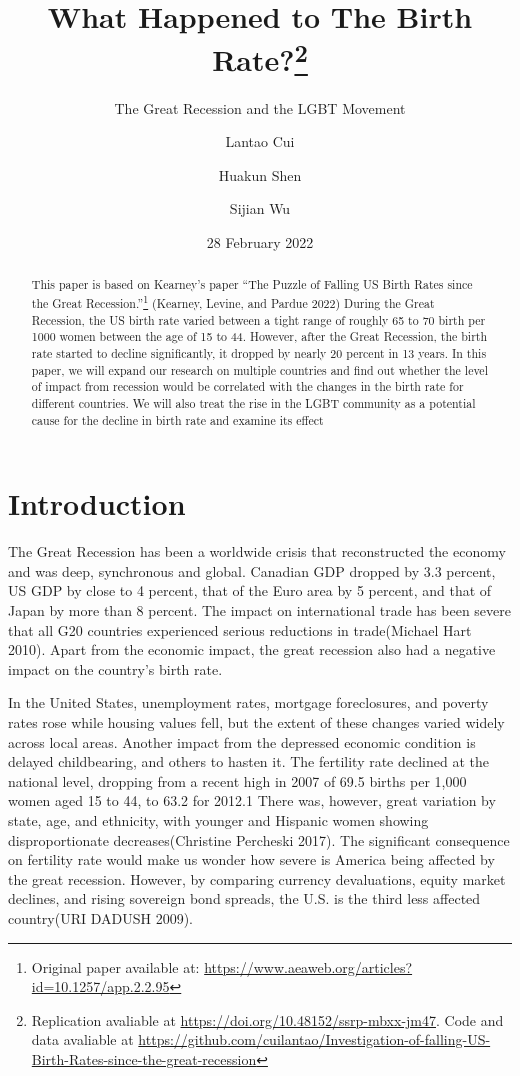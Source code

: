 \documentclass[
]{article}
\title{What Happened to The Birth Rate?\thanks{Replication avaliable at \url{https://doi.org/10.48152/ssrp-mbxx-jm47}. Code and data avaliable at \url{https://github.com/cuilantao/Investigation-of-falling-US-Birth-Rates-since-the-great-recession}}}
\subtitle{The Great Recession and the LGBT Movement}
\author{Lantao Cui \and Huakun Shen \and Sijian Wu}
\date{28 February 2022}
\begin{document}
\maketitle
\begin{abstract}
This paper is based on Kearney's paper ``The Puzzle of Falling US Birth Rates since the Great Recession.''\footnote{Original paper available at: \url{https://www.aeaweb.org/articles?id=10.1257/app.2.2.95}} (Kearney, Levine, and Pardue 2022) During the Great Recession, the US birth rate varied between a tight range of roughly 65 to 70 birth per 1000 women between the age of 15 to 44. However, after the Great Recession, the birth rate started to decline significantly, it dropped by nearly 20 percent in 13 years. In this paper, we will expand our research on multiple countries and find out whether the level of impact from recession would be correlated with the changes in the birth rate for different countries. We will also treat the rise in the LGBT community as a potential cause for the decline in birth rate and examine its effect
\end{abstract}

\hypertarget{introduction}{%
\section{Introduction}\label{introduction}}

The Great Recession has been a worldwide crisis that reconstructed the economy and was deep, synchronous and global. Canadian GDP dropped by 3.3 percent, US GDP by close to 4 percent, that of the Euro area by 5 percent, and that of Japan by more than 8 percent. The impact on international trade has been severe that all G20 countries experienced serious reductions in trade(Michael Hart 2010). Apart from the economic impact, the great recession also had a negative impact on the country's birth rate.

In the United States, unemployment rates, mortgage foreclosures, and poverty rates rose while housing values fell, but the extent of these changes varied widely across local areas. Another impact from the depressed economic condition is delayed childbearing, and others to hasten it. The fertility rate declined at the national level, dropping from a recent high in 2007 of 69.5 births per 1,000 women aged 15 to 44, to 63.2 for 2012.1 There was, however, great variation by state, age, and ethnicity, with younger and Hispanic women showing disproportionate decreases(Christine Percheski 2017). The significant consequence on fertility rate would make us wonder how severe is America being affected by the great recession. However, by comparing currency devaluations, equity market declines, and rising sovereign bond spreads, the U.S. is the third less affected country(URI DADUSH 2009).
\end{document}
